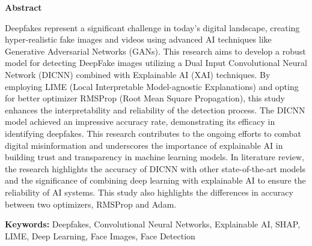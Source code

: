 \pagestyle{plain}
\vspace*{52pt}
\begin{center}
    \large{\textbf{Abstract}}\\[31pt]
\end{center}

Deepfakes represent a significant challenge in today's digital landscape, creating hyper-realistic fake images and videos using advanced AI techniques like Generative Adversarial Networks (GANs). This research aims to develop a robust model for detecting DeepFake images utilizing a Dual Input Convolutional Neural Network (DICNN) combined with Explainable AI (XAI) techniques. 
By employing LIME (Local Interpretable Model-agnostic Explanations) and opting for better optimizer RMSProp (Root Mean Square Propagation), this study enhances the interpretability and reliability of the detection process. 
The DICNN model achieved an impressive accuracy rate, demonstrating its efficacy in identifying deepfakes. 
This research contributes to the ongoing efforts to combat digital misinformation and underscores the importance of explainable AI in building trust and transparency in machine learning models.
In literature review, the research highlights the accuracy of DICNN with other state-of-the-art models and the significance of combining deep learning with explainable AI to ensure the reliability of AI systems.
This study also highlights the differences in accuracy between two optimizers, RMSProp and Adam. 


\begin{flushleft}
    \textbf{Keywords:} Deepfakes, Convolutional Neural Networks, Explainable AI, SHAP, LIME, Deep Learning, Face Images, Face Detection
\end{flushleft}

